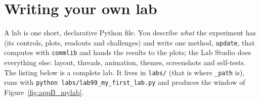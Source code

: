 \section{Writing your own lab}
\label{sec:appB:ownlab}

A lab is one short, declarative Python file. You describe \emph{what} the experiment has (its
controls, plots, readouts and challenges) and write one method, \texttt{update}, that computes with
\texttt{commlib} and hands the results to the plots; the Lab Studio does everything else: layout,
threads, animation, themes, screenshots and self-tests. The listing below is a complete lab. It
lives in \texttt{labs/} (that is where \texttt{\_path} is), runs with
\texttt{python labs/lab99\_my\_first\_lab{}.py} and produces the window of
Figure~\ref{fig:appB_mylab}.


